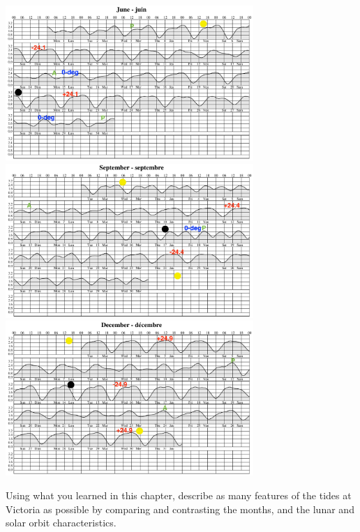 \begin{center}
\includegraphics[width=3.7in]{figs/Waves/TideJun2020}
\includegraphics[width=3.7in]{figs/Waves/TideSep2020}
\includegraphics[width=3.7in]{figs/Waves/TideDec2020}    
\end{center}

Using what you learned in this chapter, describe as many features of the tides at Victoria as possible by comparing and contrasting the months, and the lunar and solar orbit characteristics.
 
